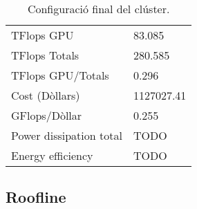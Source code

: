 \begin{table}[H]
\begin{adjustwidth}{-1.0in}{-1.0in}
\begin{center}
\begin{tabular}{l|l}
{\color[HTML]{000000}TFlops GPU}                & {\color[HTML]{000000}83.085}                    \\ 
{\cellcolor[HTML]{EFEFEF}TFlops Totals}             & {\cellcolor[HTML]{EFEFEF}280.585}                   \\ 
{\color[HTML]{000000}TFlops GPU/Totals}         & {\color[HTML]{000000} 0.296}                    \\ 
{\cellcolor[HTML]{EFEFEF}Cost (Dòllars)}                 & {\cellcolor[HTML]{EFEFEF}1127027.41}              \\
{\color[HTML]{000000}GFlops/Dòllar}               & {\color[HTML]{000000}0.255}                    \\
    \rowcolor[HTML]{EFEFEF}
Power dissipation total & TODO \\
    Energy efficiency & TODO \\ \hline
\end{tabular}
\caption{Configuració final del clúster.}
\end{center}
\end{adjustwidth}
\end{table}




\subsection{Roofline}



